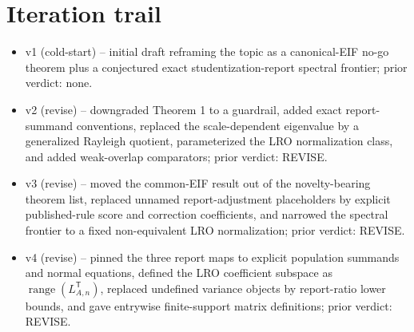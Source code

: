 \documentclass[11pt]{article}
\newcommand{\transpose}{\mathsf{T}}
\theoremstyle{definition}
\theoremstyle{plain}
\theoremstyle{remark}
\begin{document}
\section{Iteration trail}
\begin{itemize}[leftmargin=*]
\item v1 (cold-start) -- initial draft reframing the topic as a canonical-EIF
no-go theorem plus a conjectured exact studentization-report spectral
frontier; prior verdict: none.
\item v2 (revise) -- downgraded Theorem 1 to a guardrail, added exact
report-summand conventions, replaced the scale-dependent eigenvalue by a
generalized Rayleigh quotient, parameterized the LRO normalization class, and
added weak-overlap comparators; prior verdict: REVISE.
\item v3 (revise) -- moved the common-EIF result out of the novelty-bearing
theorem list, replaced unnamed report-adjustment placeholders by explicit
published-rule score and correction coefficients, and narrowed the spectral
frontier to a fixed non-equivalent LRO normalization; prior verdict: REVISE.
\item v4 (revise) -- pinned the three report maps to explicit population
summands and normal equations, defined the LRO coefficient subspace as
\(\operatorname{range}(L_{A,n}^{\transpose})\), replaced undefined variance
objects by report-ratio lower bounds, and gave entrywise finite-support matrix
definitions; prior verdict: REVISE.
\end{itemize}
\end{document}
